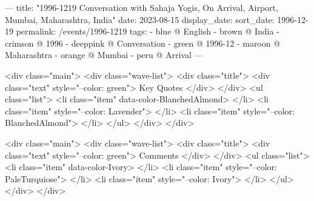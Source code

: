 ---
title: "1996-1219 Conversation with Sahaja Yogis, On Arrival, Airport, Mumbai, Maharashtra, India"
date: 2023-08-15
display_date: 
sort_date: 1996-12-19
permalink: /events/1996-1219
tags:
  - blue @ English
  - brown @ India
  - crimson @ 1996
  - deeppink @ Conversation
  - green @ 1996-12
  - maroon @ Maharashtra
  - orange @ Mumbai
  - peru @ Arrival
---

<div class="main">
  <div class="wave-list">
    <div class="title">
      <div class="text" style="--color: green">
        Key Quotes
      </div>
    </div>
    <ul class="list">
        <li class="item" data-color-BlanchedAlmond>
        </li>
        <li class="item" style="--color: Lavender">
        </li>
        <li class="item" style="--color: BlanchedAlmond">
        </li>
      </ul>
  </div>
</div>

<div class="main">
  <div class="wave-list">
    <div class="title">
      <div class="text" style="--color: green">
        Comments
      </div>
    </div>
    <ul class="list">
        <li class="item" data-color-Ivory>
        </li>
        <li class="item" style="--color: PaleTurquiose">
        </li>
        <li class="item" style="--color: Ivory">
        </li>
      </ul>
  </div>
</div>